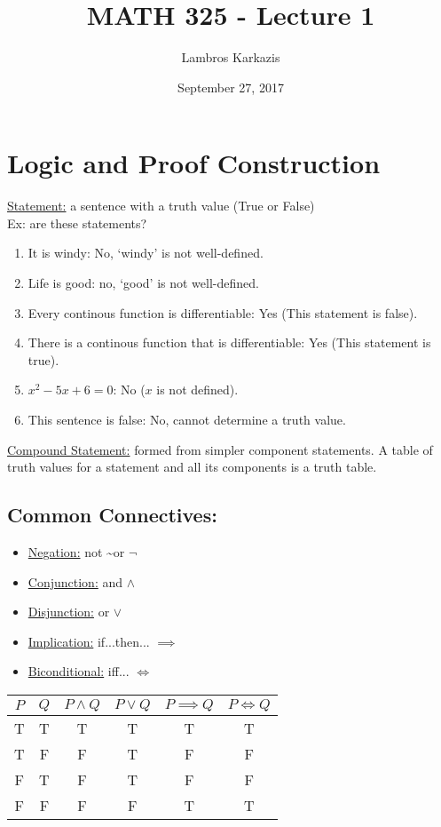 \documentclass{article}
\title{MATH 325 - Lecture 1}
\author{Lambros Karkazis}
\date{September 27, 2017}
\begin{document}
\maketitle

\section{Logic and Proof Construction}
\underline{Statement:} a sentence with a truth value (True or False)\\
Ex: are these statements?
\begin{enumerate}
\item It is windy: No, `windy' is not well-defined.
\item Life is good: no, `good' is not well-defined.
\item Every continous function is differentiable: Yes (This statement is false).
\item There is a continous function that is differentiable: Yes (This statement is true).
\item $x^2 - 5x + 6 = 0$: No ($x$ is not defined).
\item This sentence is false: No, cannot determine a truth value.
\end{enumerate}
\underline{Compound Statement:} formed from simpler component statements. A table of truth values for a statement and all its components is a truth table.
\subsection{Common Connectives:}
\begin{itemize}
\item \underline{Negation:} not \textasciitilde or $\neg$
\item \underline{Conjunction:} and $\wedge$
\item \underline{Disjunction:} or $\vee$
\item \underline{Implication:} if...then... $\implies$
\item \underline{Biconditional:} iff... $\iff$
\end{itemize}
\begin{center}	
\begin{tabular}{|| c | c | c | c | c | c ||}
\hline\hline
$P$ & $Q$ & $P \wedge Q$ & $P \vee Q$ & $P \implies Q$ & $P \iff Q$ \\ [0.5ex] 
\hline\hline
T & T & T & T & T & T \\
\hline
T & F & F & T & F & F \\
\hline
F & T & F & T & F & F \\
\hline
F & F & F & F & T & T \\
\hline\hline
\end{tabular}
\end{center}
\end{document}
